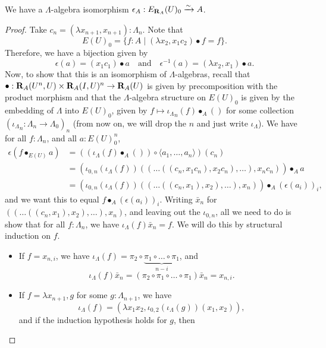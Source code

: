 \begin{lemma}\label{lem:elementary-essentially-surjective}
  We have a $ \Lambda $-algebra isomorphism $ \epsilon_A : E_{\mathbf{R}_A}(U)_0 \xrightarrow \sim A $.
\end{lemma}
\begin{proof}
  Take $ c_n = (\lambda x_{n + 1}, x_{n + 1}): \Lambda_n $. Note that
  \[ E(U)_0 = \{ f : A \mid (\lambda x_2, x_1 c_2) \bullet f = f \}. \]
  Therefore, we have a bijection given by
  \[ \epsilon(a) = (x_1 c_1) \bullet a \quad \text{and} \quad \epsilon^{-1}(a) = (\lambda x_2, x_1) \bullet a. \]
  Now, to show that this is an isomorphism of $ \Lambda $-algebras, recall that $ \bullet: \mathbf{R}_A(U^n, U) \times \mathbf{R}_A(I, U)^n \to \mathbf{R}_A(U) $ is given by precomposition with the product morphism and that the $ \Lambda $-algebra structure on $ E(U)_0 $ is given by the embedding of $ \Lambda $ into $ E(U)_0 $, given by $ f \mapsto {\iota_\Lambda}_n(f) \bullet_A () $ for some collection $ ({\iota_\Lambda}_n: \Lambda_n \to \Lambda_0)_n $ (from now on, we will drop the $ n $ and just write $ \iota_\Lambda $). We have for all $ f: \Lambda_n $, and all $ a : E(U)_0^n $,
  \begin{align*}
    \epsilon(f \bullet_{E(U)} a)
    &= ((\iota_\Lambda(f) \bullet_A ()) \circ \langle a_1, \dots, a_n \rangle)(c_n)\\
    &= (\iota_{0, n}(\iota_\Lambda(f)) ((\dots((c_n, x_1 c_n), x_2 c_n), \dots), x_n c_n)) \bullet_A a\\
    &= (\iota_{0, n}(\iota_\Lambda(f)) ((\dots((c_n, x_1), x_2), \dots), x_n)) \bullet_A (\epsilon(a_i))_i,
  \end{align*}
  and we want this to equal $ f \bullet_A (\epsilon(a_i))_i $. Writing $ \bar x_n $ for $ ((\dots((c_n, x_1), x_2), \dots), x_n) $, and leaving out the $ \iota_{0, n} $, all we need to do is show that for all $ f: \Lambda_n $, we have $ \iota_\Lambda(f) \bar x_n = f $. We will do this by structural induction on $ f $.
  \begin{itemize}
    \item If $ f = x_{n, i} $, we have $ \iota_\Lambda(f) = \pi_2 \circ \underbrace{\pi_1 \circ \dots \circ \pi_1}_{n - i} $, and
      \[ \iota_\Lambda(f) \bar x_n = (\pi_2 \circ \pi_1 \circ \dots \circ \pi_1) \bar x_n = x_{n, i}. \]
    \item If $ f = \lambda x_{n + 1}, g $ for some $ g: \Lambda_{n + 1} $, we have
      \[ \iota_\Lambda(f) = (\lambda x_1 x_2, \iota_{0, 2}(\iota_\Lambda(g)) (x_1, x_2)), \]
      and if the induction hypothesis holds for $ g $, then

\end{itemize}
\end{proof}
